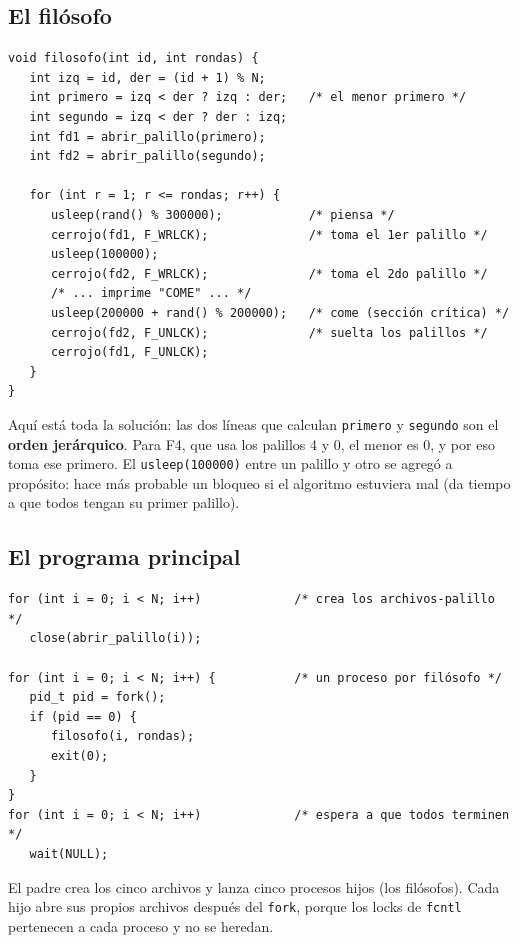 \documentclass[12pt,letterpaper]{article}
\newcommand{\cod}[1]{\texttt{#1}}
\begin{document}
\subsection{El filósofo}
\par\smallskip\noindent\begin{minipage}{\linewidth}
\begin{lstlisting}
void filosofo(int id, int rondas) {
   int izq = id, der = (id + 1) % N;
   int primero = izq < der ? izq : der;   /* el menor primero */
   int segundo = izq < der ? der : izq;
   int fd1 = abrir_palillo(primero);
   int fd2 = abrir_palillo(segundo);

   for (int r = 1; r <= rondas; r++) {
      usleep(rand() % 300000);            /* piensa */
      cerrojo(fd1, F_WRLCK);              /* toma el 1er palillo */
      usleep(100000);
      cerrojo(fd2, F_WRLCK);              /* toma el 2do palillo */
      /* ... imprime "COME" ... */
      usleep(200000 + rand() % 200000);   /* come (sección crítica) */
      cerrojo(fd2, F_UNLCK);              /* suelta los palillos */
      cerrojo(fd1, F_UNLCK);
   }
}
\end{lstlisting}
\end{minipage}\par\smallskip
Aquí está toda la solución: las dos líneas que calculan \cod{primero} y \cod{segundo} son el \textbf{orden jerárquico}. Para F4, que usa los palillos 4 y 0, el menor es 0, y por eso toma ese primero. El \cod{usleep(100000)} entre un palillo y otro se agregó a propósito: hace más probable un bloqueo si el algoritmo estuviera mal (da tiempo a que todos tengan su primer palillo).

\subsection{El programa principal}
\par\smallskip\noindent\begin{minipage}{\linewidth}
\begin{lstlisting}
for (int i = 0; i < N; i++)             /* crea los archivos-palillo */
   close(abrir_palillo(i));

for (int i = 0; i < N; i++) {           /* un proceso por filósofo */
   pid_t pid = fork();
   if (pid == 0) {
      filosofo(i, rondas);
      exit(0);
   }
}
for (int i = 0; i < N; i++)             /* espera a que todos terminen */
   wait(NULL);
\end{lstlisting}
\end{minipage}\par\smallskip
El padre crea los cinco archivos y lanza cinco procesos hijos (los filósofos). Cada hijo abre sus propios archivos después del \cod{fork}, porque los locks de \cod{fcntl} pertenecen a cada proceso y no se heredan.
\end{document}
